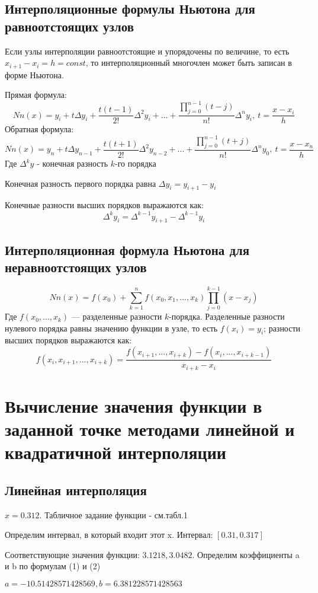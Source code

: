\documentclass[12pt, a4paper]{article}
\begin{document}
\subsection*{Интерполяционные формулы Ньютона для равноотстоящих узлов}
Если узлы интерполяции равноотстоящие и упорядочены по величине, то есть
$x_{i+1} - x_i = h = const$, то интерполяционный многочлен может быть записан
в форме Ньютона.

Прямая формула:
$$Nn(x) = y_i + t\Delta y_i + \frac{t(t-1)}{2!}\Delta^2 y_i + ... + \frac{\prod_{j=0}^{n-1} (t-j)}{n!}\Delta^n y_i,\ t = \frac{x - x_i}{h}$$
Обратная формула:
$$Nn(x) = y_n + t\Delta y_{n-1} + \frac{t(t+1)}{2!}\Delta^2 y_{n-2} + ... + \frac{\prod_{j=0}^{n-1} (t+j)}{n!}\Delta^n y_0,\ t = \frac{x - x_n}{h}$$
Где $\Delta^k y$ - конечная разность $k$-го порядка

Конечная разность первого порядка равна $\Delta y_i = y_{i+1} - y_i$

Конечные разности высших порядков выражаются как:
$$\Delta^k y_i = \Delta^{k-1} y_{i+1} - \Delta^{k-1} y_i$$
\subsection*{Интерполяционная формула Ньютона для неравноотстоящих узлов}
$$Nn(x) = f(x_0) + \sum_{k=1}^n f(x_0, x_1, ..., x_k) \prod_{j=0}^{k-1} (x - x_j)$$
Где $f(x_0, ..., x_k)$ — разделенные разности $k$-порядка.
Разделенные разности нулевого порядка равны значению функции в узле,
то есть $f(x_i) = y_i$; разности высших порядков выражаются как:
$$f(x_i, x_{i+1}, ..., x_{i+k}) = \frac{f(x_{i+1}, ..., x_{i+k}) - f(x_i, ..., x_{i+k-1})}{x_{i+k} - x_i}$$

\section*{Вычисление значения функции в заданной точке методами линейной
  и квадратичной интерполяции}
\subsection*{Линейная интерполяция}
$x = 0.312$. Табличное задание функции - см.табл.1

Определим интервал, в который входит этот x.
Интервал: $[0.31, 0.317]$

Соответствующие значения функции: $3.1218, 3.0482$.
Определим коэффициенты a и b по формулам (1) и (2)

$a = -10.51428571428569, b = 6.381228571428563$
\end{document}
